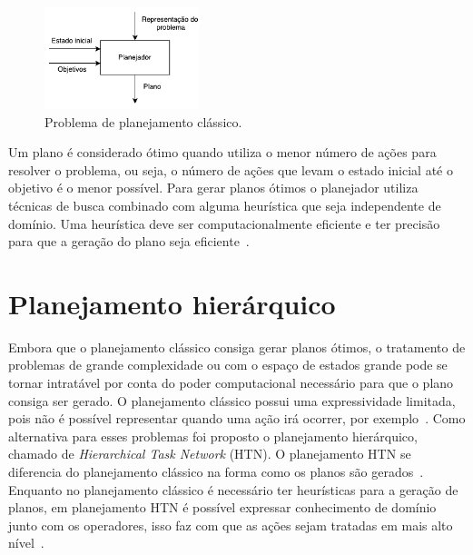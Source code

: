 \begin{figure}[ht]
	\centering
	\includegraphics[width=0.4\textwidth]{fig/modelo.pdf}
	\caption{Problema de planejamento clássico.}
	\label{fig:planmodelo}
\end{figure} 

Um plano é considerado ótimo quando utiliza o menor número de ações para resolver o problema, ou seja, o número de ações que levam o estado inicial até o objetivo é o menor possível. 
Para gerar planos ótimos o planejador utiliza técnicas de busca combinado com alguma heurística que seja independente de domínio. 
Uma heurística deve ser computacionalmente eficiente e ter precisão para que a geração do plano seja eficiente~\cite{helmert2007flexible}.

\section{Planejamento hierárquico} 


Embora que o planejamento clássico consiga gerar planos ótimos, o tratamento de problemas de grande complexidade ou com o espaço de estados grande pode se tornar intratável por conta do poder computacional necessário para que o plano consiga ser gerado.
O planejamento clássico possui uma expressividade limitada, pois não é possível representar quando uma ação irá ocorrer, por exemplo~\cite{intelligence2003modern}.
Como alternativa para esses problemas foi proposto o planejamento hierárquico, chamado de \textit{Hierarchical Task Network} (HTN). 
O planejamento HTN se diferencia do planejamento clássico na forma como os planos são gerados~\cite{ghallab2004automated}. 
Enquanto no planejamento clássico é necessário ter heurísticas para a geração de planos, em planejamento HTN é possível expressar conhecimento de domínio junto com os operadores, isso faz com que as ações sejam tratadas em mais alto nível~\cite{intelligence2003modern}.  

